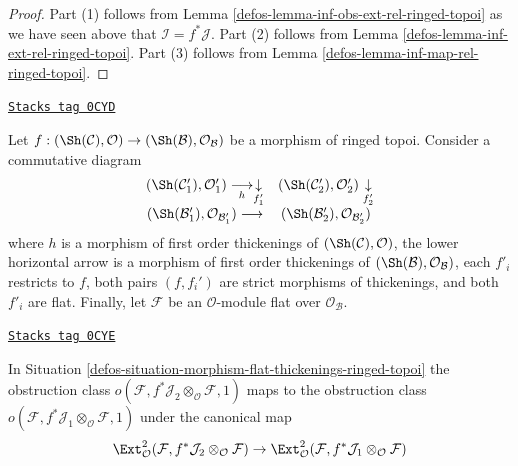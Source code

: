 \begin{proof}

Part (1) follows from Lemma \ref{defos-lemma-inf-obs-ext-rel-ringed-topoi}
as we have seen above that $\mathcal{I} = f^*\mathcal{J}$.
Part (2) follows from Lemma \ref{defos-lemma-inf-ext-rel-ringed-topoi}.
Part (3) follows from Lemma \ref{defos-lemma-inf-map-rel-ringed-topoi}.
\end{proof}

\begin{definition}
\label{defos-situation-morphism-flat-thickenings-ringed-topoi}
\href{https://stacks.math.columbia.edu/tag/0CYD}{\texttt{Stacks tag 0CYD}}

Let $f : (\Sh(\mathcal{C}), \mathcal{O}) \to
(\Sh(\mathcal{B}), \mathcal{O}_\mathcal{B})$ be a morphism of
ringed topoi. Consider a commutative diagram
$$
\begin{array}{cc}(\Sh(\mathcal{C}'_1), \mathcal{O}'_1) \underset{h}{\longrightarrow}\underset{f'_1}{\downarrow} & (\Sh(\mathcal{C}'_2), \mathcal{O}'_2) \underset{f'_2}{\downarrow} \\ (\Sh(\mathcal{B}'_1), \mathcal{O}_{\mathcal{B}'_1}) \longrightarrow & (\Sh(\mathcal{B}'_2), \mathcal{O}_{\mathcal{B}'_2})\end{array}
$$
where $h$ is a morphism of first order thickenings
of $(\Sh(\mathcal{C}), \mathcal{O})$, the lower horizontal arrow
is a morphism of first order thickenings of
$(\Sh(\mathcal{B}), \mathcal{O}_\mathcal{B})$, each $f'_i$ restricts
to $f$, both pairs $(f, f_i')$ are strict morphisms of thickenings, and
both $f'_i$ are flat. Finally, let $\mathcal{F}$ be an
$\mathcal{O}$-module flat over $\mathcal{O}_\mathcal{B}$.
\end{definition}

\begin{lemma}
\label{defos-lemma-functorial-ringed-topoi}
\href{https://stacks.math.columbia.edu/tag/0CYE}{\texttt{Stacks tag 0CYE}}

In Situation \ref{defos-situation-morphism-flat-thickenings-ringed-topoi}
the obstruction class
$o(\mathcal{F}, f^*\mathcal{J}_2 \otimes_\mathcal{O} \mathcal{F}, 1)$
maps to the obstruction class
$o(\mathcal{F}, f^*\mathcal{J}_1 \otimes_\mathcal{O} \mathcal{F}, 1)$
under the canonical map
$$
\Ext^2_\mathcal{O}(
\mathcal{F}, f^*\mathcal{J}_2 \otimes_\mathcal{O} \mathcal{F})
\to \Ext^2_\mathcal{O}(
\mathcal{F}, f^*\mathcal{J}_1 \otimes_\mathcal{O} \mathcal{F})
$$
\end{lemma}

